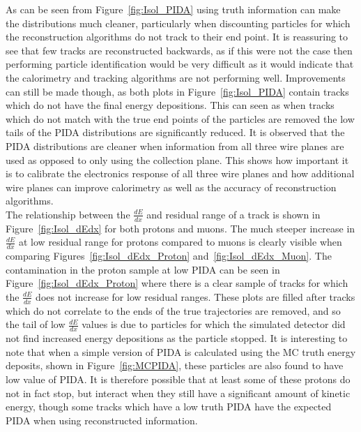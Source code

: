 As can be seen from Figure~\ref{fig:Isol_PIDA} using truth information can make the distributions much cleaner, particularly when discounting particles for which the reconstruction algorithms do not track to their end point. It is reassuring to see that few tracks are reconstructed backwards, as if this were not the case then performing particle identification would be very difficult as it would indicate that the calorimetry and tracking algorithms are not performing well. Improvements can still be made though, as both plots in Figure~\ref{fig:Isol_PIDA} contain tracks which do not have the final energy depositions. This can seen as when tracks which do not match with the true end points of the particles are removed the low tails of the PIDA distributions are significantly reduced. It is observed that the PIDA distributions are cleaner when information from all three wire planes are used as opposed to only using the collection plane. This shows how important it is to calibrate the electronics response of all three wire planes and how additional wire planes can improve calorimetry as well as the accuracy of reconstruction algorithms. \\

The relationship between the $\frac{dE}{dx}$ and residual range of a track is shown in Figure~\ref{fig:Isol_dEdx} for both protons and muons. The much steeper increase in $\frac{dE}{dx}$ at low residual range for protons compared to muons is clearly visible when comparing Figures~\ref{fig:Isol_dEdx_Proton} and~\ref{fig:Isol_dEdx_Muon}. The contamination in the proton sample at low PIDA can be seen in Figure~\ref{fig:Isol_dEdx_Proton} where there is a clear sample of tracks for which the $\frac{dE}{dx}$ does not increase for low residual ranges. These plots are filled after tracks which do not correlate to the ends of the true trajectories are removed, and so the tail of low $\frac{dE}{dx}$ values is due to particles for which the simulated detector did not find increased energy depositions as the particle stopped. It is interesting to note that when a simple version of PIDA is calculated using the MC truth energy deposits, shown in Figure~\ref{fig:MCPIDA}, these particles are also found to have low value of PIDA. It is therefore possible that at least some of these protons do not in fact stop, but interact when they still have a significant amount of kinetic energy, though some tracks which have a low truth PIDA have the expected PIDA when using reconstructed information. \\

